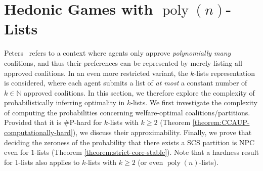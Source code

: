 \documentclass[letterpaper]{article} %
\newtheorem{theorem}{Theorem}
\DeclareMathOperator*{\poly}{poly}
\begin{document}


\section{Hedonic Games with $\poly(n)$-Lists}
\label{sec:DHGs with $k$-Lists}
Peters~ refers to a context where agents only approve \textit{polynomially many} coalitions, and thus their preferences can be represented by merely listing all approved coalitions. In an even more restricted variant, the $k$-lists representation is considered, where each agent submits a list of \textit{at most} a constant number of $k \in \mathbb{N}$ approved coalitions. In this section, we therefore explore the complexity of probabilistically inferring optimality in $k$-lists. We first investigate the complexity of computing the probabilities concerning welfare-optimal coalitions/partitions. Provided that it is \#P-hard for $k$-lists with $k \geq 2$ (Theorem \ref{theorem:CCAUP-computationally-hard}), we discuss their approximability. Finally, we prove that deciding the zeroness of the probability that there exists a SCS partition is NPC even for $1$-lists (Theorem \ref{theorem:strict-core-stable}). Note that a hardness result for $1$-lists also applies to $k$-lists with $k \geq 2$ (or even $\poly(n)$-lists). %
\end{document}
